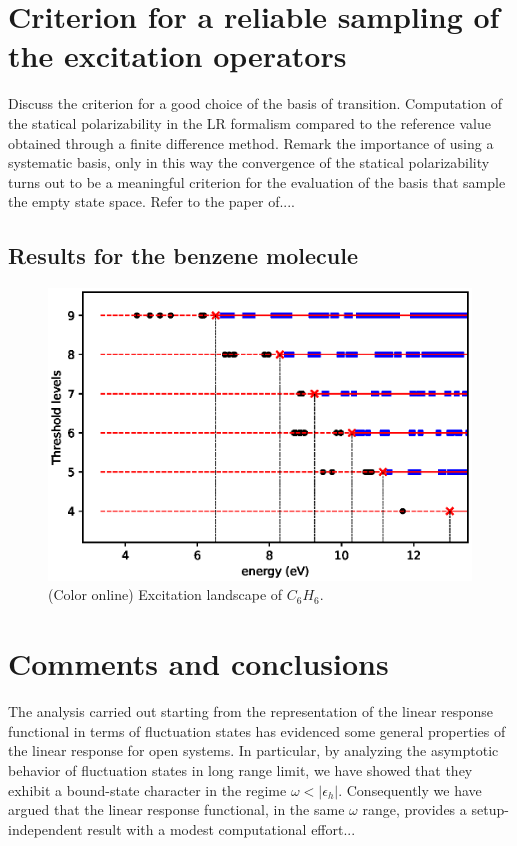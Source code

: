 \documentclass[reprint,aps,prb]{revtex4-1}
\newcommand{\eps}{\epsilon}
\begin{document}
\section{Criterion for a reliable sampling of the excitation operators} %

Discuss the criterion for a good choice of the basis of transition. Computation of the statical polarizability in the LR formalism compared to the reference value
obtained through a finite difference method. Remark the importance of using a systematic basis, only in this way the convergence of the statical polarizability turns out to 
be a meaningful criterion for the evaluation of the basis that sample the empty state space. Refer to the paper of....

\subsection{Results for the benzene molecule}

\begin{figure}[ht]
\includegraphics[scale=0.56]{c6h6_excitationLandscape.eps}
\caption{\label{c6h6_excLand}(Color online) Excitation landscape of $C_6H_6$.}
\end{figure}


\section{Comments and conclusions}

The analysis carried out starting from the representation of the linear response functional in terms of fluctuation states has evidenced some general properties of the linear response
for open systems. In particular, by analyzing the asymptotic behavior of fluctuation states in long range limit, we have showed that they exhibit a bound-state character in the regime  
$\omega<|\eps_h|$. Consequently we have argued that the linear response functional, in the same $\omega$ range, provides a setup-independent result with a modest computational effort... 
\end{document}
